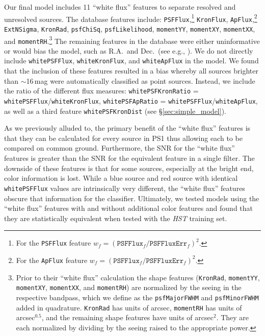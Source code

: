 \documentclass[twocolumn]{aastex62}
\begin{document}
\begin{CJK*}{UTF8}{gbsn}
Our final model includes 11 ``white flux'' features to separate resolved and unresolved sources. The database features include: \texttt{PSFFlux},\footnote{For the
\texttt{PSFFlux} feature $w_f =
(\mathtt{PSFFlux}_f/\mathtt{PSFFluxErr}_f)^2$.} \texttt{KronFlux},
\texttt{ApFlux},\footnote{For the \texttt{ApFlux} feature $w_f =
(\mathtt{PSFFlux}_f/\mathtt{PSFFluxErr}_f)^2$.} 
\texttt{ExtNSigma},
\texttt{KronRad}, \texttt{psfChiSq}, \texttt{psfLikelihood},
\texttt{momentYY}, \texttt{momentXY}, \texttt{momentXX}, and
\texttt{momentRH}.\footnote{Prior to their ``white flux'' calculation the
shape features (\texttt{KronRad}, \texttt{momentYY}, \texttt{momentXY},
\texttt{momentXX}, and \texttt{momentRH}) are normalized by the seeing in the
respective bandpass, which we define as the \texttt{psfMajorFWHM} and
\texttt{psfMinorFWHM} added in quadrature. \texttt{KronRad} has units of
arcsec, \texttt{momentRH} has units of arcsec$^{0.5}$, and the remaining
shape features have units of arcsec$^{2}$. They are each normalized by
dividing by the seeing raised to the appropriate power. } The remaining
features in the database were either uninformative or would bias the model,
such as R.A.\ and Dec.\ (see e.g., \citealt{Richards12a}). We do not directly
include \texttt{whitePSFFlux}, \texttt{whiteKronFlux}, and
\texttt{whiteApFlux} in the model. We found that the inclusion of these
features resulted in a bias whereby all sources brighter than $\sim$16\,mag
were automatically classified as point sources. Instead, we include the ratio of the
different flux measures: \texttt{whitePSFKronRatio} =
\texttt{whitePSFFlux}/\texttt{whiteKronFlux}, \texttt{whitePSFApRatio} =
\texttt{whitePSFFlux}/\texttt{whiteApFlux}, as well as a third feature
\texttt{whitePSFKronDist} (see \S\ref{sec:simple_model}).

As we previously alluded to, the primary benefit of the ``white flux''
features is that they can be calculated for every source in PS1 thus
allowing each to be compared on common ground. Furthermore, the SNR for the
``white flux'' features is greater than the SNR for the equivalent feature
in a single filter. The downside of these features is that for some sources,
especially at the bright end, color information is lost. While a blue source
and red source with identical \texttt{whitePSFFlux} values are intrinsically
very different, the ``white flux'' features obscure that information for the
classifier. Ultimately, we tested models using the ``white flux'' features
with and without additional color features and found that they are
statistically equivalent when tested with the \textit{HST} training set.


\end{CJK*}
\end{document}
